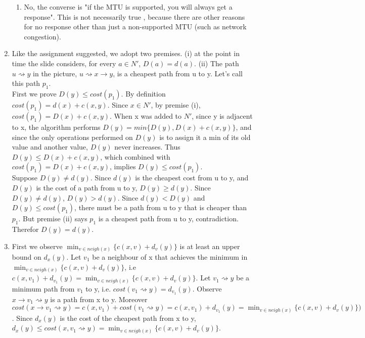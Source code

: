\documentclass[12pt]{article}
\begin{document}
\begin{enumerate}
\begin{enumerate}
		\item No, the converse is "if the MTU is supported, you will always get a response". This is not necessarily true , because there are other reasons for no response other than just a non-supported MTU (such as network congestion).
	\end{enumerate}
	\item %
        Like the assignment suggested, we adopt two premises. 
        (i) at the point in time the slide considers, for every $a \in N'$, $D(a) = d(a)$. 
        (ii) The path $u \rightsquigarrow y$ in the picture, $u \rightsquigarrow x \rightarrow y$,
        is a cheapest path from u to y. Let's call this path $p_1$.\\


        First we prove $D(y) \leq cost(p_1)$. By definition $cost(p_1) = d(x) + c(x,y)$. Since $x \in N'$, 
        by premise (i), $cost(p_1) = D(x) + c(x,y)$. When x was added to $N'$, since y is adjacent to x,
        the algorithm performs $D(y) = min\{D(y), D(x)+c(x,y)\}$, and since the only operations performed on $D(y)$ is to assign
        it a min of its old value and another value, $D(y)$ never increases. Thus $D(y) \leq D(x) + c(x,y)$,
        which combined with $cost(p_1) = D(x) + c(x,y)$, implies $D(y) \leq cost(p_1)$. \\

        Suppose $D(y) \neq d(y)$. Since $d(y)$ is the cheapest cost from u to y, and $D(y)$ is the 
        cost of a path from u to y, $D(y) \geq d(y)$. Since $D(y) \neq d(y)$, $D(y) > d(y)$. 
        Since $d(y) < D(y)$ and $D(y) \leq cost(p_1)$, there must be a path from u to y that is cheaper 
        than $p_1$. But premise (ii) says $p_1$ is a cheapest path from u to y, contradiction. Therefor $D(y) = d(y)$.
        

	\item %
        
        First we observe $\min_{v \in neigh(x)}\{c(x,v) + d_v(y)\}$
        is at least an upper bound on $d_x(y)$. Let $v_1$ be a neighbour of x that achieves the minimum in
        $\min_{v \in neigh(x)}\{c(x,v) + d_v(y)\}$, i.e $c(x,v_1)+d_{v_1}(y) = \min_{v \in neigh(x)}\{c(x,v) + d_v(y)\}$.  
        Let $v_1 \rightsquigarrow y$ be a minimum path from $v_1$
        to y, i.e. $cost(v_1 \rightsquigarrow y) = d_{v_1}(y)$. Observe $x \rightarrow v_1 \rightsquigarrow y$ is a path from x to y. Moreover
        $cost(x \rightarrow v_1 \rightsquigarrow y) = c(x, v_1) + cost(v_1 \rightsquigarrow y) = c(x, v_1) + d_{v_1}(y) =
        \min_{v \in neigh(x)}\{c(x,v) + d_v(y)\})$.
        Since $d_x(y)$ is the cost of the cheapest path from x to y, 
        $d_x(y) \leq cost(x,v_1 \rightsquigarrow y) = \min_{v \in neigh(x)}\{c(x,v) + d_v(y)\}$. \\


\end{enumerate}
\end{document}
